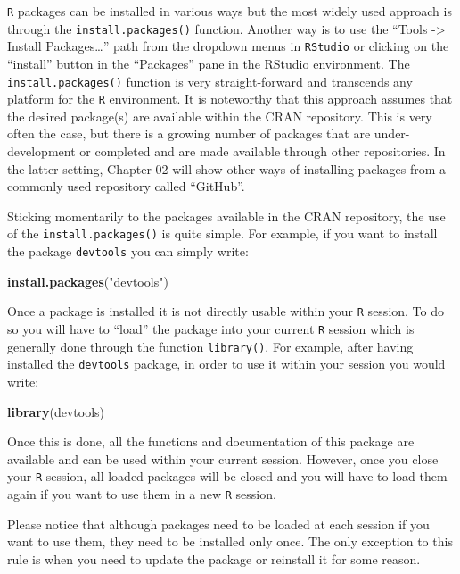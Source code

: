 \documentclass[12pt,]{krantz}
\newenvironment{Shaded}{\begin{snugshade}}{\end{snugshade}}
\newcommand{\KeywordTok}[1]{\textcolor[rgb]{0.27,0.27,0.27}{\textbf{#1}}}
\newcommand{\StringTok}[1]{\textcolor[rgb]{0.5,0.5,0.5}{#1}}
\newcommand{\NormalTok}[1]{#1}
\let\BeginKnitrBlock\begin \let\EndKnitrBlock\end
\begin{document}
\texttt{R} packages can be installed in various ways but the most widely
used approach is through the \texttt{install.packages()} function.
Another way is to use the ``Tools -\textgreater{} Install
Packages\ldots{}'' path from the dropdown menus in \texttt{RStudio} or
clicking on the ``install'' button in the ``Packages'' pane in the
RStudio environment. The \texttt{install.packages()} function is very
straight-forward and transcends any platform for the \texttt{R}
environment. It is noteworthy that this approach assumes that the
desired package(s) are available within the CRAN repository. This is
very often the case, but there is a growing number of packages that are
under-development or completed and are made available through other
repositories. In the latter setting, Chapter 02 will show other ways of
installing packages from a commonly used repository called ``GitHub''.

Sticking momentarily to the packages available in the CRAN repository,
the use of the \texttt{install.packages()} is quite simple. For example,
if you want to install the package \texttt{devtools} you can simply
write:

\begin{Shaded}
\begin{Highlighting}[]
\KeywordTok{install.packages}\NormalTok{(}\StringTok{"devtools"}\NormalTok{)}
\end{Highlighting}
\end{Shaded}

Once a package is installed it is not directly usable within your
\texttt{R} session. To do so you will have to ``load'' the package into
your current \texttt{R} session which is generally done through the
function \texttt{library()}. For example, after having installed the
\texttt{devtools} package, in order to use it within your session you
would write:

\begin{Shaded}
\begin{Highlighting}[]
\KeywordTok{library}\NormalTok{(devtools)}
\end{Highlighting}
\end{Shaded}

Once this is done, all the functions and documentation of this package
are available and can be used within your current session. However, once
you close your \texttt{R} session, all loaded packages will be closed
and you will have to load them again if you want to use them in a new
\texttt{R} session.

\BeginKnitrBlock{rmdnote}
Please notice that although packages need to be loaded at each session
if you want to use them, they need to be installed only once. The only
exception to this rule is when you need to update the package or
reinstall it for some reason.
\EndKnitrBlock{rmdnote}
\end{document}

